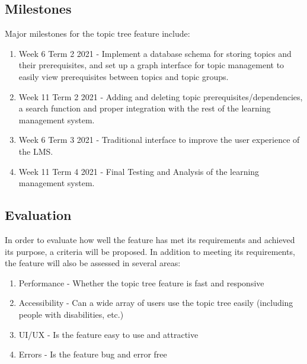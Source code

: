 \newpage
\subsection{Milestones}
Major milestones for the topic tree feature include: \\
\begin{enumerate}
\item Week 6 Term 2 2021 - Implement a database schema for storing topics and their prerequisites, and set up a graph interface for topic management to easily view prerequisites between topics and topic groups.
\item Week 11 Term 2 2021 - Adding and deleting topic prerequisites/dependencies, a search function and proper integration with the rest of the learning management system.
\item Week 6 Term 3 2021 - Traditional interface to improve the user experience of the LMS.
\item Week 11 Term 4 2021 - Final Testing and Analysis of the learning management system.
\end{enumerate}

\subsection{Evaluation}
In order to evaluate how well the feature has met its requirements and achieved its purpose, a criteria will be proposed. In addition to meeting its requirements, the feature will also be assessed in several areas:
\begin{enumerate}
    \item Performance - Whether the topic tree feature is fast and responsive
    \item Accessibility - Can a wide array of users use the topic tree easily (including people with disabilities, etc.)
    \item UI/UX - Is the feature easy to use and attractive
    \item Errors - Is the feature bug and error free
\end{enumerate}
